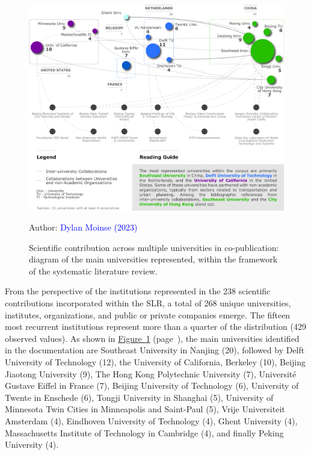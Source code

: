 \begin{refsegment}
\begin{figure}[h!]\vspace*{4pt}
    \caption{Scientific contribution across multiple universities in co-publication: diagram of the main universities represented, within the framework of the systematic literature review.}
    \label{fig-chap2:copublications-universites-rsl}
    \centerline{\includegraphics[width=1\columnwidth]{src/Figures/Chap-2/EN_RSL_Collaborations_universites.pdf}}
    \vspace{5pt}
    \begin{flushright}\scriptsize{
    Author: \textcolor{blue}{Dylan Moinse (2023)}
    }\end{flushright}
\end{figure}

From the perspective of the institutions represented in the 238 scientific contributions incorporated within the \acrshort{SLR}, a total of 268 unique universities, institutes, organizations, and public or private companies emerge. The fifteen most recurrent institutions represent more than a quarter of the distribution (429 observed values). As shown in \hyperref[fig-chap2:copublications-universites-rsl]{Figure~\ref{fig-chap2:copublications-universites-rsl}} (page~\pageref{fig-chap2:copublications-universites-rsl}), the main universities identified in the documentation are Southeast University in Nanjing (20), followed by Delft University of Technology (12), the University of California, Berkeley (10), Beijing Jiaotong University (9), The Hong Kong Polytechnic University (7), Université Gustave Eiffel in France (7), Beijing University of Technology (6), University of Twente in Enschede (6), Tongji University in Shanghai (5), University of Minnesota Twin Cities in Minneapolis and Saint-Paul (5), Vrije Universiteit Amsterdam (4), Eindhoven University of Technology (4), Ghent University (4), Massachusetts Institute of Technology in Cambridge (4), and finally Peking University (4). %


\end{refsegment}
